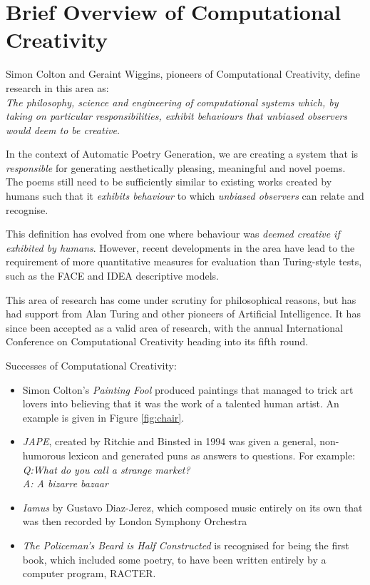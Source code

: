 \section{Brief Overview of Computational Creativity}
Simon Colton and Geraint Wiggins, pioneers of Computational Creativity, define research in this area as: \\
\textit{The philosophy, science and engineering of computational systems which, by taking on particular responsibilities, exhibit behaviours that unbiased observers would deem to be creative.}\cite{colton2012computational}

In the context of Automatic Poetry Generation, we are creating a system that is \textit{responsible} for generating aesthetically pleasing, meaningful and novel poems. The poems still need to be sufficiently similar to existing works created by humans such that it \textit{exhibits behaviour} to which \textit{unbiased observers} can relate and recognise.

This definition has evolved from one where behaviour was \textit{deemed creative if exhibited by humans}\cite{wiggins2006searching}. However, recent developments in the area have lead to the requirement of more quantitative measures for evaluation than Turing-style tests, such as the FACE and IDEA descriptive models\cite{colton2011computational}.

This area of research has come under scrutiny for philosophical reasons, but has had support from Alan Turing and other pioneers of Artificial Intelligence. It has since been accepted as a valid area of research, with the annual International Conference on Computational Creativity heading into its fifth round.

Successes of Computational Creativity:
\begin{itemize}
\item{Simon Colton's \textit{Painting Fool}\cite{colton2012painting} produced paintings that managed to trick art lovers into believing that it was the work of a talented human artist. An example is given in Figure \ref{fig:chair}.}
\item{\textit{JAPE}\cite{binsted1997computational}, created by Ritchie and Binsted in 1994 was given a general, non-humorous lexicon and generated puns as answers to questions. For example:\\\textit{Q:What do you call a strange market?\\ A: A bizarre bazaar}}
\item{\textit{Iamus} by Gustavo Diaz-Jerez\cite{diaz2011composing}, which composed music entirely on its own that was then recorded by London Symphony Orchestra}
\item{\textit{The Policeman's Beard is Half Constructed}\cite{chamberlain1984policeman} is recognised for being the first book, which included some poetry, to have been written entirely by a computer program, RACTER.}
\end{itemize} 

